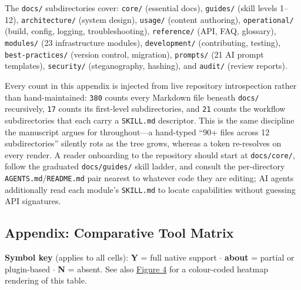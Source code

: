 \documentclass[
]{article}
\begin{document}
The \texttt{docs/} subdirectories cover: \texttt{core/} (essential
docs), \texttt{guides/} (skill levels 1--12), \texttt{architecture/}
(system design), \texttt{usage/} (content authoring),
\texttt{operational/} (build, config, logging, troubleshooting),
\texttt{reference/} (API, FAQ, glossary), \texttt{modules/} (23
infrastructure modules), \texttt{development/} (contributing, testing),
\texttt{best-practices/} (version control, migration), \texttt{prompts/}
(21 AI prompt templates), \texttt{security/} (steganography, hashing),
and \texttt{audit/} (review reports).

Every count in this appendix is injected from live repository
introspection rather than hand-maintained: \texttt{380} counts every
Markdown file beneath \texttt{docs/} recursively, \texttt{17} counts its
first-level subdirectories, and \texttt{21} counts the workflow
subdirectories that each carry a \texttt{SKILL.md} descriptor. This is
the same discipline the manuscript argues for throughout---a hand-typed
``90+ files across 12 subdirectories'' silently rots as the tree grows,
whereas a token re-resolves on every render. A reader onboarding to the
repository should start at \texttt{docs/core/}, follow the graduated
\texttt{docs/guides/} skill ladder, and consult the per-directory
\texttt{AGENTS.md}/\texttt{README.md} pair nearest to whatever code they
are editing; AI agents additionally read each module's \texttt{SKILL.md}
to locate capabilities without guessing API signatures.

\newpage

\newpage

\subsection{Appendix: Comparative Tool Matrix}\label{appendix-matrix}

\textbf{Symbol key} (applies to all cells): \textbf{Y} = full native
support \texorpdfstring{\ensuremath{\cdot}}{.} \textbf{about } = partial or plugin-based \texorpdfstring{\ensuremath{\cdot}}{.}
\textbf{N} = absent. See also
\href{04_results.md\#comparative-feature-analysis}{Figure 4} for a
colour-coded heatmap rendering of this table.

\begin{table}[h]
\caption{Comparative feature matrix (14 capabilities $\times$ 10 tools). Y~=~full native support, about ~=~partial or plugin-based, N~=~absent.}
\label{tab:comparative-matrix}
\end{table}
\end{document}
